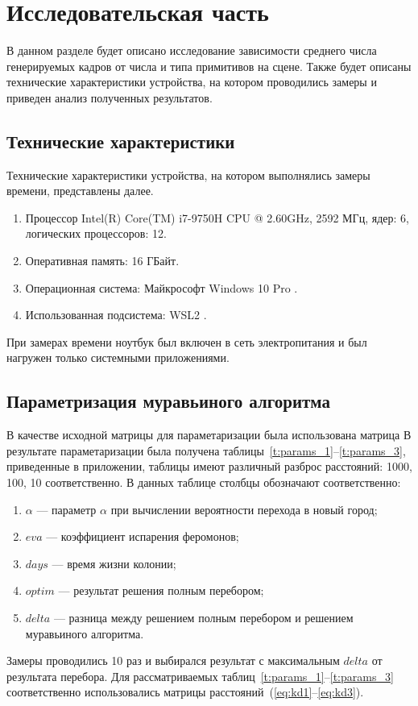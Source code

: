 \chapter{Исследовательская часть}


В данном разделе будет описано исследование зависимости среднего числа генерируемых кадров от числа и типа примитивов на сцене. Также будет описаны технические характеристики устройства, на котором проводились замеры и приведен анализ полученных результатов.

\section{Технические характеристики}

Технические характеристики устройства, на котором выполнялись замеры времени, представлены далее.

\begin{enumerate}
	\item Процессор	Intel(R) Core(TM) i7-9750H CPU @ 2.60GHz, 2592 МГц, ядер: 6, логических процессоров: 12.
	\item Оперативная память: 16 ГБайт.
	\item Операционная система: Майкрософт Windows 10 Pro \cite{windows}.
	\item Использованная подсистема: WSL2 \cite{WSL2}.
\end{enumerate}

При замерах времени ноутбук был включен в сеть электропитания и был нагружен только системными приложениями.

\section{Параметризация муравьиного алгоритма}
В качестве исходной матрицы для параметаризации была использована матрица 
В результате параметаризации была получена таблицы~\ref{t:params_1}--\ref{t:params_3}, приведенные в приложении, таблицы имеют различный разброс расстояний: 1000, 100, 10 соответственно.
В данных таблице
столбцы обозначают соответственно:
\begin{enumerate}
	\item $\alpha$ --- параметр $\alpha$ при вычислении вероятности перехода в новый город;
	\item $eva$ --- коэффициент испарения феромонов;
	\item $days$ --- время жизни колонии;
	\item $optim$ --- результат решения полным перебором;
	\item $delta$ --- разница между решением полным перебором и решением муравьиного алгоритма.
\end{enumerate}
Замеры проводились 10 раз и выбирался результат с максимальным $delta$ от результата перебора.
Для рассматриваемых таблиц~\ref{t:params_1}--\ref{t:params_3} соответственно использовались матрицы расстояний~(\ref{eq:kd1}--\ref{eq:kd3}).

